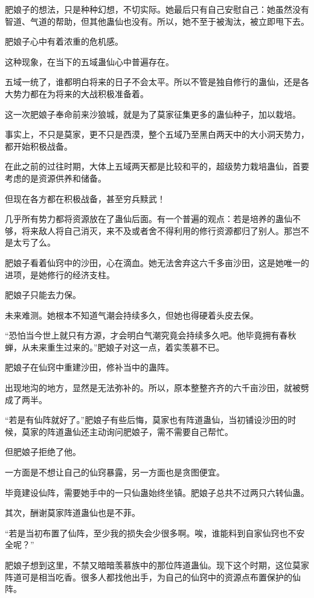 \begin{this_body}
肥娘子的想法，只是种种幻想，不切实际。她最后只有自己安慰自己：她虽然没有智道、气道的帮助，但其他蛊仙也没有。所以，她不至于被淘汰，被立即甩下去。

肥娘子心中有着浓重的危机感。

这种现象，在当下的五域蛊仙心中普遍存在。

五域一统了，谁都明白将来的日子不会太平。所以不管是独自修行的蛊仙，还是各大势力都在为将来的大战积极准备着。

这一次肥娘子奉命前来沙狼城，就是为了莫家征集更多的蛊仙种子，加以栽培。

事实上，不只是莫家，更不只是西漠，整个五域乃至黑白两天中的大小洞天势力，都开始积极战备。

在此之前的过往时期，大体上五域两天都是比较和平的，超级势力栽培蛊仙，首要考虑的是资源供养和储备。

但现在各方都在积极战备，甚至穷兵黩武！

几乎所有势力都将资源放在了蛊仙后面。有一个普遍的观点：若是培养的蛊仙不够，将来敌人将自己消灭，来不及或者舍不得利用的修行资源都归了别人。那岂不是太亏了么。

肥娘子看着仙窍中的沙田，心在滴血。她无法舍弃这六千多亩沙田，这是她唯一的进项，是她修行的经济支柱。

肥娘子只能去力保。

未来难测。她根本不知道气潮会持续多久，但她也得硬着头皮去保。

“恐怕当今世上就只有方源，才会明白气潮究竟会持续多久吧。他毕竟拥有春秋蝉，从未来重生过来的。”肥娘子对这一点，着实羡慕不已。

肥娘子在仙窍中重建沙田，修补当中的蛊阵。

出现地沟的地方，显然是无法弥补的。所以，原本整整齐齐的六千亩沙田，就被劈成了两半。

“若是有仙阵就好了。”肥娘子有些后悔，莫家也有阵道蛊仙，当初铺设沙田的时候，莫家的阵道蛊仙还主动询问肥娘子，需不需要自己帮忙。

但肥娘子拒绝了他。

一方面是不想让自己的仙窍暴露，另一方面也是贪图便宜。

毕竟建设仙阵，需要她手中的一只仙蛊始终坐镇。肥娘子总共不过两只六转仙蛊。

其次，酬谢莫家阵道蛊仙也是不菲。

“若是当初布置了仙阵，至少我的损失会少很多啊。唉，谁能料到自家仙窍也不安全呢？”

肥娘子想到这里，不禁又暗暗羡慕族中的那位阵道蛊仙。现下这个时期，这位莫家阵道可是相当吃香。很多人都找他出手，为自己的仙窍中的资源点布置保护的仙阵。


\end{this_body}
